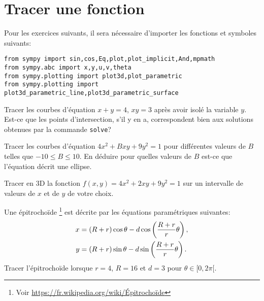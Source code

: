 

\section{Tracer une fonction}

Pour les exercices suivants, il sera nécessaire d'importer les fonctions
et symboles suivants:
\begin{verbatim}
from sympy import sin,cos,Eq,plot,plot_implicit,And,mpmath
from sympy.abc import x,y,u,v,theta
from sympy.plotting import plot3d,plot_parametric
from sympy.plotting import plot3d_parametric_line,plot3d_parametric_surface
\end{verbatim}

\begin{exercice}
    Tracer les courbes d'équation $x+y=4$, $xy=3$ après avoir isolé la variable
    $y$. Est-ce que les points d'intersection, s'il y en a, correspondent bien aux
    solutions obtenues par la commande \texttt{solve}?
\end{exercice}

\begin{exercice}
    Tracer les courbes d'équation $4x^2+Bxy+9y^2=1$ pour différentes valeurs de
    $B$ telles que $-10\leq B\leq 10$. En déduire pour quelles valeurs de $B$
    est-ce que l'équation décrit une ellipse.
\end{exercice}

\begin{exercice}
Tracer en 3D la fonction $f(x,y) = 4x^2+2xy+9y^2=1$ sur un intervalle de valeurs
de $x$ et de $y$ de votre choix.
\end{exercice}

\begin{exercice}
Une épitrochoïde \footnote{Voir \url{https://fr.wikipedia.org/wiki/Épitrochoïde}}
est décrite par les équations paramétriques suivantes:
\begin{align*}
    x &= (R + r)\cos\theta - d\cos\left({R + r \over r}\theta\right),\\
    y &= (R + r)\sin\theta - d\sin\left({R + r \over r}\theta\right).
\end{align*}
Tracer l'épitrochoïde lorsque $r=4$, $R=16$ et $d=3$ pour $\theta\in[0,2\pi[$.
\end{exercice}

